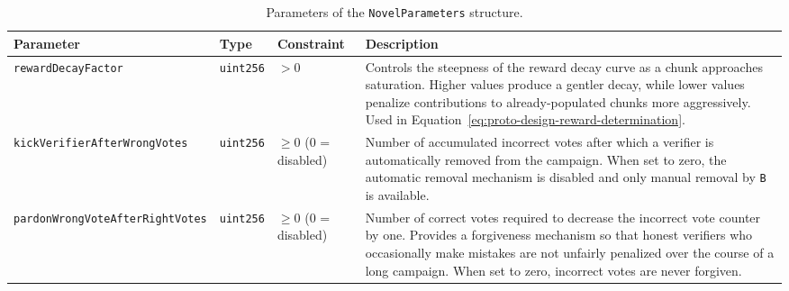 \begin{table}
    \begin{tabular}{p{3.8cm} l p{2.8cm} p{4.8cm}}
        \hline
        \textbf{Parameter} & \textbf{Type} & \textbf{Constraint} & \textbf{Description} \\
        \hline
        \texttt{rewardDecayFactor}
        & \texttt{uint256}
        & $> 0$
        & Controls the steepness of the reward decay curve as a chunk approaches saturation.
        Higher values produce a gentler decay, while lower values penalize contributions to already-populated chunks more aggressively.
        Used in Equation~\ref{eq:proto-design-reward-determination}. \\[6pt]

        \texttt{kickVerifierAfter\-WrongVotes}
        & \texttt{uint256}
        & $\geq 0$ (0 = disabled)
        & Number of accumulated incorrect votes after which a verifier is automatically removed from the campaign.
        When set to zero, the automatic removal mechanism is disabled and only manual removal by \texttt{B} is available. \\[6pt]

        \texttt{pardonWrongVote\-AfterRightVotes}
        & \texttt{uint256}
        & $\geq 0$ (0 = disabled)
        & Number of correct votes required to decrease the incorrect vote counter by one.
        Provides a forgiveness mechanism so that honest verifiers who occasionally make mistakes are not unfairly penalized over the course of a long campaign.
        When set to zero, incorrect votes are never forgiven. \\
        \hline
    \end{tabular}
    \caption{Parameters of the \texttt{NovelParameters} structure.}
    \label{tab:appendix-a-params-novel}
\end{table}